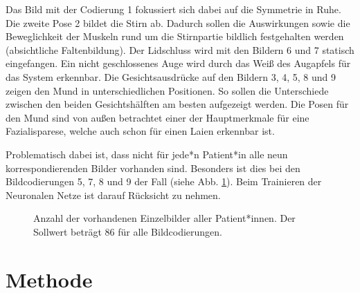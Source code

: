 Das Bild mit der Codierung 1 fokussiert sich dabei auf die Symmetrie in Ruhe. Die zweite Pose 2 bildet die Stirn ab. Dadurch sollen die Auswirkungen sowie die Beweglichkeit der Muskeln rund um die Stirnpartie bildlich festgehalten werden (absichtliche Faltenbildung). Der Lidschluss wird mit den Bildern 6 und 7 statisch eingefangen. Ein nicht geschlossenes Auge wird durch das Weiß des Augapfels für das System erkennbar. Die Gesichtsausdrücke auf den Bildern 3, 4, 5, 8 und 9 zeigen den Mund in unterschiedlichen Positionen. So sollen die Unterschiede zwischen den beiden Gesichtshälften am besten aufgezeigt werden. Die Posen für den Mund sind von außen betrachtet einer der Hauptmerkmale für eine Fazialisparese, welche auch schon für einen Laien erkennbar ist.

Problematisch dabei ist, dass nicht für jede*n Patient*in alle neun korrespondierenden Bilder vorhanden sind. Besonders ist dies bei den Bildcodierungen 5, 7, 8 und 9 der Fall (siehe Abb. \ref{cap:bar_code}). Beim Trainieren der Neuronalen Netze ist darauf Rücksicht zu nehmen.


\begin{figure}[!tb]\centering
{}
\caption[Anzahl der vorhandenen  Einzelbilder aller Patient*innen]{Anzahl der vorhandenen  Einzelbilder aller Patient*innen. Der Sollwert beträgt 86 für alle Bildcodierungen.}\label{cap:bar_code}
\end{figure}\label{fig:bar_code}





\clearpage
\section{Methode}\label{method}
